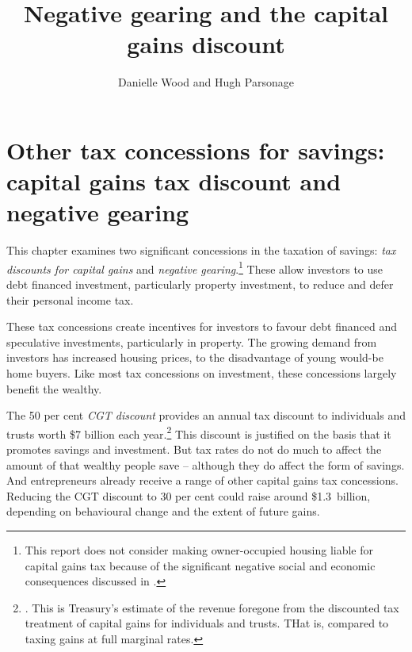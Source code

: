 \documentclass{grattan}\usepackage[]{graphicx}\usepackage[]{color}
\title{Negative gearing and the capital gains discount}
\author{Danielle Wood and Hugh Parsonage}
\newcommand{\highlight}[1]{\emph{#1}}
\begin{document}
\clearpage


\raggedbottom
\setcounter{tocdepth}{1}
\contentspage














\chapter{Other tax concessions for savings: capital gains tax discount and negative gearing}
This chapter examines two significant concessions in the taxation of savings: \highlight{tax discounts for capital gains} and \highlight{negative gearing}.\footnote{This report does not consider making owner-occupied housing liable for capital gains tax because of the significant negative social and economic consequences discussed in \textcite[pp.~43-45]{Daley2013}.}  These allow investors to use debt financed investment, particularly property investment, to reduce and defer their personal income tax.

These tax concessions create incentives for investors to favour debt financed and speculative investments, particularly in property. The growing demand from investors has increased housing prices, to the disadvantage of young would-be home buyers. Like most tax concessions on investment, these concessions largely benefit the wealthy. 

The 50 per cent \highlight{CGT discount} provides an annual tax discount to individuals and trusts worth \$7 billion each year.\footnote{\textcite[p.4-21]{Treasury2015a}. This is Treasury's estimate of the revenue foregone from the discounted tax treatment of capital gains for individuals and trusts. THat is, compared to taxing gains at full marginal rates.} This discount is justified on the basis that it promotes savings and investment. But tax rates do not do much to affect the amount of that wealthy people save -- although they do affect the form of savings. And entrepreneurs already receive a range of other capital gains tax concessions. Reducing the CGT discount to 30 per cent could raise around \$1.3~billion, depending on behavioural change and the extent of future gains.
\end{document}
